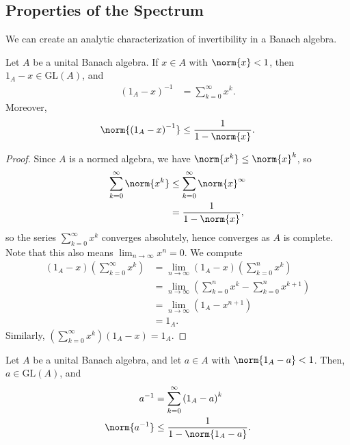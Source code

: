 \documentclass[10pt]{mypackage}
\newcommand{\GL}{\text{GL}}
\begin{document}
\subsection{Properties of the Spectrum}%
We can create an analytic characterization of invertibility in a Banach algebra.
\begin{proposition}
  Let $A$ be a unital Banach algebra. If $x\in A$ with $\norm{x} < 1$, then $1_A-x\in \GL\left(A\right)$, and
  \begin{align*}
    \left(1_A - x\right)^{-1} &= \sum_{k=0}^{\infty}x^k.
  \end{align*}
  Moreover,
  \begin{align*}
    \norm{\left(1_A - x\right)^{-1}} \leq \frac{1}{1-\norm{x}}.
  \end{align*}
\end{proposition}
\begin{proof}
  Since $A$ is a normed algebra, we have $\norm{x^k} \leq \norm{x}^k$, so
  \begin{align*}
    \sum_{k=0}^{\infty}\norm{x^k} &\leq \sum_{k=0}^{\infty}\norm{x}^{\infty}\\
                                  &= \frac{1}{1-\norm{x}},
  \end{align*}
  so the series $\sum_{k=0}^{\infty}x^k$ converges absolutely, hence converges as $A$ is complete. Note that this also means $\lim_{n\rightarrow\infty}x^n = 0$. We compute
  \begin{align*}
    \left(1_A - x\right)\left(\sum_{k=0}^{\infty}x^k\right) &= \lim_{n\rightarrow\infty}\left(1_A - x\right)\left(\sum_{k=0}^{n}x^k\right)\\
                                                            &= \lim_{n\rightarrow\infty}\left(\sum_{k=0}^{n}x^k - \sum_{k=0}^{n}x^{k+1}\right)\\
                                                            &= \lim_{n\rightarrow\infty}\left(1_A  - x^{n+1}\right)\\
                                                            &= 1_A.
  \end{align*}
  Similarly, $\left(\sum_{k=0}^{\infty}x^k\right)\left(1_A - x\right) = 1_A$.
\end{proof}
\begin{corollary}
  Let $A$ be a unital Banach algebra, and let $a\in A$ with $\norm{1_A - a} < 1$. Then, $a\in \GL\left(A\right)$, and
  \begin{align*}
    a^{-1} &= \sum_{k=0}^{\infty}\left(1_A - a\right)^k\\
    \norm{a^{-1}} &\leq \frac{1}{1-\norm{1_A - a}}.
  \end{align*}
\end{corollary}
\end{document}
